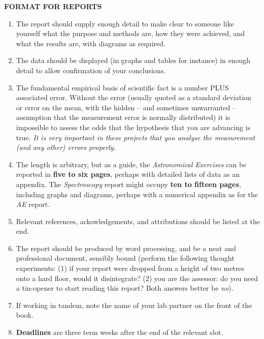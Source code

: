 \documentclass[12pt]{article}
\begin{document}
\begin{center}
{\bf FORMAT FOR REPORTS}
\end{center}
\begin{enumerate}
\item The report should supply enough detail to make clear to someone like yourself what the purpose and methods are, how they were achieved, and what the results are, with diagrams as required. 

\item The data should be displayed (in graphs and tables for instance) in enough detail to allow confirmation of your conclusions.

\item The fundamental empirical basis of scientific fact is a number PLUS associated error. Without the error (usually quoted as a standard deviation or error on the mean, with the hidden -- and sometimes unwarranted -- assumption that the measurement error is normally distributed) it is impossible to assess the odds that the hypothesis that you are advancing is true. {\sl It is very important in these projects that you analyse the measurement (and any other) errors properly.}

\item The length is arbitrary, but as a guide, the {\sl Astronomical Exercises} can be reported in {\bf five to six pages}, perhaps with detailed lists of data as an appendix. The {\sl Spectroscopy} report might occupy {\bf ten to fifteen pages}, including graphs and diagrams, perhaps with a numerical appendix as for the {\sl AE} report.

\item Relevant references, ackowledgements, and attributions should be listed at the end.

\item The report should be produced by word processing, and be a neat and professional document, sensibly bound (perform the following thought experiments: (1) if your report were dropped from a height of two metres onto a hard floor, would it disintegrate? (2) you are the assessor: do you need a tin-opener to start reading this report? Both answers better be {\sl no}).

\item If working in tandem, note the name of your lab partner on the front of the book.

\item {\bf Deadlines} are three term weeks after the end of the relevant slot.

\end{enumerate}
\end{document}
